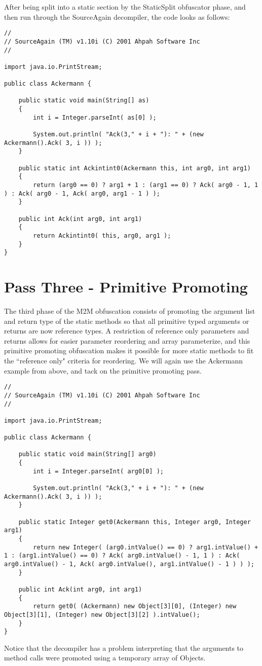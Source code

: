 After being split into a static section by the StaticSplit obfuscator phase, and then run through
the SourceAgain decompiler, the code looks as follows:

\begin{verbatim}
// 
// SourceAgain (TM) v1.10i (C) 2001 Ahpah Software Inc
// 

import java.io.PrintStream;

public class Ackermann {

    public static void main(String[] as)
    {
        int i = Integer.parseInt( as[0] );

        System.out.println( "Ack(3," + i + "): " + (new Ackermann().Ack( 3, i )) );
    }

    public static int Ackintint0(Ackermann this, int arg0, int arg1)
    {
        return (arg0 == 0) ? arg1 + 1 : (arg1 == 0) ? Ack( arg0 - 1, 1 ) : Ack( arg0 - 1, Ack( arg0, arg1 - 1 ) );
    }

    public int Ack(int arg0, int arg1)
    {
        return Ackintint0( this, arg0, arg1 );
    }
}
\end{verbatim}

\section{Pass Three - Primitive Promoting}
The third phase of the M2M obfuscation consists of promoting the argument list and return type of 
the static methods so that all primitive typed arguments or returns are now reference types.  A restriction
of reference only parameters and returns allows for easier parameter reordering and array parameterize,
and this primitive promoting obfuscation makes it possible for more static methods to fit the ``reference
only" criteria for reordering.  We will again use the Ackermann example from above, and tack on the 
primitive promoting pass.

\begin{verbatim}
// 
// SourceAgain (TM) v1.10i (C) 2001 Ahpah Software Inc
// 

import java.io.PrintStream;

public class Ackermann {

    public static void main(String[] arg0)
    {
        int i = Integer.parseInt( arg0[0] );

        System.out.println( "Ack(3," + i + "): " + (new Ackermann().Ack( 3, i )) );
    }

    public static Integer get0(Ackermann this, Integer arg0, Integer arg1)
    {
        return new Integer( (arg0.intValue() == 0) ? arg1.intValue() + 1 : (arg1.intValue() == 0) ? Ack( arg0.intValue() - 1, 1 ) : Ack( arg0.intValue() - 1, Ack( arg0.intValue(), arg1.intValue() - 1 ) ) );
    }

    public int Ack(int arg0, int arg1)
    {
        return get0( (Ackermann) new Object[3][0], (Integer) new Object[3][1], (Integer) new Object[3][2] ).intValue();
    }
}

\end{verbatim}
Notice that the decompiler has a problem interpreting that the arguments to method calls were promoted using a
temporary array of Objects.

